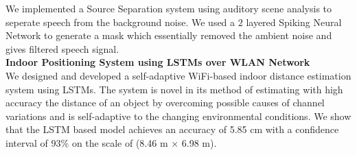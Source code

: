 \documentclass[margin,line, 9pt]{res}
\begin{document}
We implemented a Source Separation system using auditory scene analysis to seperate speech from the background noise. We used a $2$ layered Spiking Neural Network to generate a mask which essentially removed the ambient noise and gives filtered speech signal.
% 
\vspace{.1in} \\
{\bf Indoor Positioning System using LSTMs over WLAN Network} \\
We designed and developed a self-adaptive WiFi-based indoor distance estimation system using LSTMs. The system is novel in its method of estimating with high accuracy the distance of an object by overcoming possible causes of channel variations and is self-adaptive to the changing environmental conditions. We show that the LSTM based model achieves an accuracy of 5.85 cm with a confidence interval of $93\%$ on the scale of (8.46 m × 6.98 m). \\ 
\end{document}

